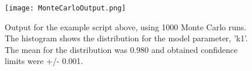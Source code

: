 \begin{singlespace}

\end{singlespace}

\begin{figure}[ht]
\centering
\texttt{[image: MonteCarloOutput.png]}
\caption{Output for the example script above, using 1000 Monte Carlo runs. The histogram shows the distribution for the model parameter, 'k1'. The mean for the distribution was 0.980 and  obtained confidence limits were +/- 0.001.}
\label{fig:mcFig}
\end{figure}






